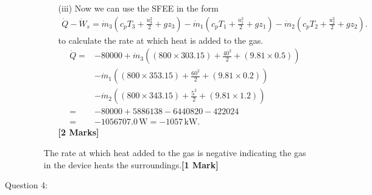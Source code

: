 \documentclass[12pt,twoside]{report}
\begin{document}
\begin{description}
\begin{itemize}
\begin{itemize}
\item[(iii)] Now we can use the SFEE in the form
\begin{align*}
 \dot{Q} - \dot{W}_s = \dot{m}_3 \left(c_p T_3 + \frac{u_3^2}{2} + g z_3\right) - \dot{m}_1 \left(c_p T_1 + \frac{u_1^2}{2} + g z_1\right) - \dot{m}_2 \left(c_p T_2 + \frac{u_2^2}{2} + g z_2\right).
\end{align*}
to calculate the rate at which heat is added to the gas.
\begin{align*}
 \dot{Q} =& -80000 + \dot{m}_3 \left(\left(800 \times 303.15\right) + \frac{40^2}{2} + \left(9.81 \times 0.5\right)\right) \nonumber \\
 &- \dot{m}_1 \left(\left(800 \times 353.15\right) + \frac{60^2}{2} + \left(9.81 \times 0.2\right)\right) \nonumber \\
 &- \dot{m}_2 \left(\left(800 \times 343.15\right) + \frac{5^2}{2} + \left(9.81 \times 1.2\right)\right) \nonumber \\
 =& -80000 + 5886138 - 6440820 - 422024 \nonumber \\
 =& -1056707.0\,\mbox{W} = -1057\,\mbox{kW}.
\end{align*}\hfill \textbf{[2 Marks]}
\end{itemize}
The rate at which heat added to the gas is negative indicating the gas in the device heats the surroundings.\hfill \textbf{[1 Mark]}
\end{itemize}




\clearpage

\item [Question 4:] 


\end{description}
\end{document}
